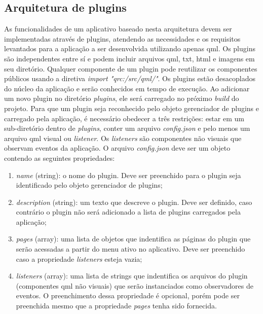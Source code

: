\subsection{Arquitetura de plugins}
As funcionalidades de um aplicativo baseado nesta arquitetura devem ser implementadas através de plugins, atendendo as necessidades e os requisitos levantados para a aplicação a ser desenvolvida utilizando apenas qml. Os plugins são independentes entre sí e podem incluir arquivos qml, txt, html e imagens em seu diretório. Qualquer componente de um plugin pode reutilizar os componentes públicos usando a diretiva \textit{import "qrc:/src/qml/"}. Os plugins estão desacoplados do núcleo da aplicação e serão conhecidos em tempo de execução. Ao adicionar um novo plugin no diretório \textit{plugins}, ele será carregado no próximo \textit{build} do projeto. Para que um plugin seja reconhecido pelo objeto gerenciador de plugins e carregado pela aplicação, é necessário obedecer a três restrições: estar em um sub-diretório dentro de \textit{plugins}, conter um arquivo \textit{config.json} e pelo menos um arquivo qml visual ou \textit{listener}. Os \textit{listeners} são componentes não visuais que observam eventos da aplicação. O arquivo \textit{config.json} deve ser um objeto contendo as seguintes propriedades:  
\begin{enumerate}
	\item \textit{name} (string): o nome do plugin. Deve ser preenchido para o plugin seja identificado pelo objeto gerenciador de plugins;

	\item \textit{description} (string): um texto que descreve o plugin. Deve ser definido, caso contrário o plugin não será adicionado a lista de plugins carregados pela aplicação;

	\item \textit{pages} (array): uma lista de objetos que indentifica as páginas do plugin que serão acessadas a partir do menu ativo no aplicativo. Deve ser preenchido caso a propriedade \textit{listeners} esteja vazia;

	\item \textit{listeners} (array): uma lista de strings que indentifica os arquivos do plugin (componentes qml não visuais) que serão instanciados como observadores de eventos. O preenchimento dessa propriedade é opcional, porém pode ser preenchida mesmo que a propriedade \textit{pages} tenha sido fornecida.
\end{enumerate}

